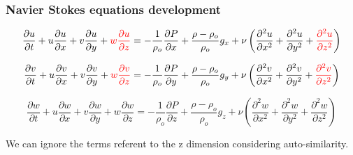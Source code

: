 \documentclass[xcolor=dvipsnames,10pt,aspectratio=169]{beamer}
\begin{document}
\begin{frame}
	\frametitle{Navier Stokes equations development}
	\centering
	\begin{equation}
		\frac{\partial u}{\partial t} + u\frac{\partial u}{\partial x} + v\frac{\partial u}{\partial y} + {\color{red} w\frac{\partial u }{\partial z} } =  -\frac{1}{\rho_o} \frac{\partial P}{\partial x} + \frac{\rho - \rho_o}{\rho_o} g_x + \nu \left( \frac{\partial ^2 u}{\partial x^2} + \frac{\partial ^2 u}{\partial y^2} + { \color{red} \frac{\partial ^2 u}{\partial z^2} } \right)
	\end{equation}

	\begin{equation}
		\frac{\partial v}{\partial t} + u\frac{\partial v}{\partial x} + v\frac{\partial v}{\partial y} + {\color{red} w\frac{\partial v }{\partial z} } =  -\frac{1}{\rho_o} \frac{\partial P}{\partial y} + \frac{\rho - \rho_o}{\rho_o} g_y + \nu \left( \frac{\partial ^2 v}{\partial x^2} + \frac{\partial ^2 v}{\partial y^2} + { \color{red} \frac{\partial ^2 v}{\partial z^2} } \right)
	\end{equation}

	{\color{red}
		\begin{equation}
			\frac{\partial w}{\partial t} + u\frac{\partial w}{\partial x} + v\frac{\partial w}{\partial y} + w\frac{\partial w }{\partial z}  =  -\frac{1}{\rho_o} \frac{\partial P}{\partial z} + \frac{\rho - \rho_o}{\rho_o} g_z + \nu \left( \frac{\partial ^2 w}{\partial x^2} + \frac{\partial ^2 w}{\partial y^2} + \frac{\partial ^2 w}{\partial z^2} \right)
		\end{equation}
	}

	We can ignore the terms referent to the z dimension considering auto-similarity.
\end{frame}
\end{document}
